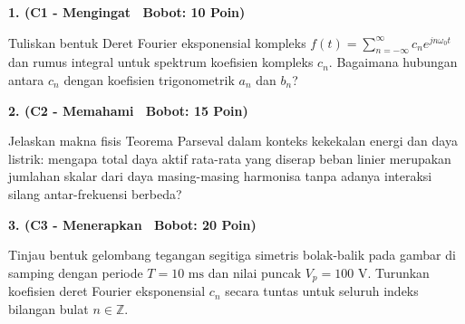 \documentclass[10pt,a4paper]{article}
\begin{document}
\par
\vspace{1mm}

\noindent\textbf{1. (C1 - Mengingat \textbar\ Bobot: 10 Poin)}\par\vspace{0.8mm}
{\footnotesize Tuliskan bentuk Deret Fourier eksponensial kompleks $f(t) = \sum_{n=-\infty}^{\infty} c_n e^{j n \omega_0 t}$ dan rumus integral untuk spektrum koefisien kompleks $c_n$. Bagaimana hubungan antara $c_n$ dengan koefisien trigonometrik $a_n$ dan $b_n$?}\par

\vspace{2.5mm}

\noindent\textbf{2. (C2 - Memahami \textbar\ Bobot: 15 Poin)}\par\vspace{0.8mm}
{\footnotesize Jelaskan makna fisis Teorema Parseval dalam konteks kekekalan energi dan daya listrik: mengapa total daya aktif rata-rata yang diserap beban linier merupakan jumlahan skalar dari daya masing-masing harmonisa tanpa adanya interaksi silang antar-frekuensi berbeda?}\par

\vspace{2.5mm}

\noindent\textbf{3. (C3 - Menerapkan \textbar\ Bobot: 20 Poin)}\par\vspace{0.8mm}
\noindent\begin{minipage}[t]{0.60\textwidth}%
  {\footnotesize Tinjau bentuk gelombang tegangan segitiga simetris bolak-balik pada gambar di samping dengan periode $T = 10\text{ ms}$ dan nilai puncak $V_p = 100\text{ V}$. Turunkan koefisien deret Fourier eksponensial $c_n$ secara tuntas untuk seluruh indeks bilangan bulat $n \in \mathbb{Z}$.}%
\end{minipage}%
\hfill%
\begin{minipage}[t]{0.37\textwidth}%
  \centering
\end{minipage}\par
\end{document}
